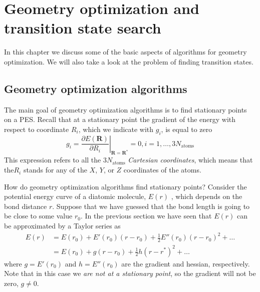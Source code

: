 \documentclass[../Main/notes.tex]{subfiles}
\begin{document}
\chapter{Geometry optimization and transition state search}

In this chapter we discuss some of the basic aspects of algorithms for geometry optimization.
We will also take a look at the problem of finding transition states.

\section{Geometry optimization algorithms}
The main goal of geometry optimization algorithms is to find stationary points on a PES.
Recall that at a stationary point the gradient of the energy with respect to coordinate $R_i$, which we indicate with $g_i$, is equal to zero
\begin{equation}
g_i = \left.\frac{\partial E(\mathbf{R})}{\partial R_i}\right|_{\mathbf{R}=\mathbf{R}^*} = 0, i=1,\ldots,3 N_\mathrm{atoms}
\end{equation}
This expression refers to all the $3 N_\mathrm{atoms}$ \emph{Cartesian coordinates}, which means that the$R_i$ stands for any of the $X$, $Y$, or $Z$ coordinates of the atoms.

How do geometry optimization algorithms find stationary points?
Consider the potential energy curve of a diatomic molecule, $E(r)$ , which depends on the bond distance $r$.
Suppose that we have guessed that the bond length is going to be close to some value $r_0$.
In the previous section we have seen that $E(r)$ can be approximated by a Taylor series as
\begin{equation}
\begin{split}
E(r) & = E(r_0) + E'(r_0) (r - r_0) + \frac{1}{2} E''(r_0) (r - r_0)^2 + \ldots \\
& = E(r_0) + g (r - r_0) + \frac{1}{2} h (r - r^*)^2 + \ldots
\end{split}
\end{equation}
where $g = E'(r_0)$ and $h = E''(r_0)$ are the gradient and hessian, respectively.
Note that in this case we \emph{are not at a stationary point}, so the gradient will not be zero, $g \neq 0$.
\end{document}
